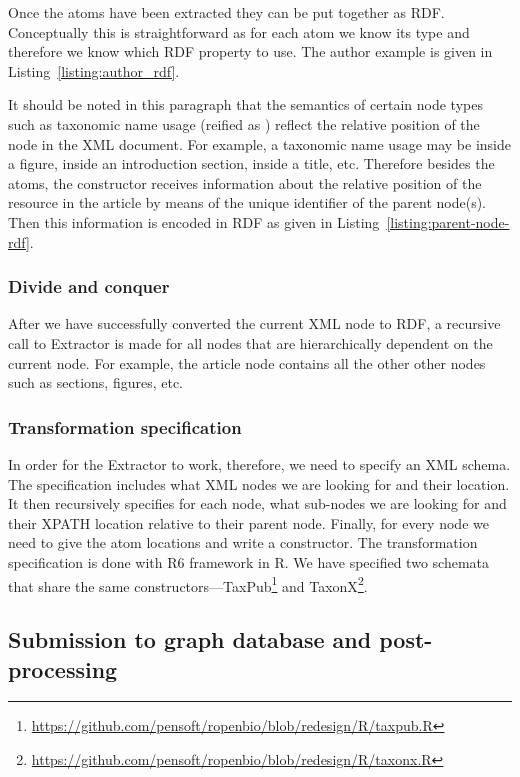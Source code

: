 Once the atoms have been extracted they can be put together as RDF. Conceptually this is straightforward as for each atom we know its type  and therefore we know which RDF property to use. The author example is given in Listing~\ref{listing:author_rdf}.

It should be noted in this paragraph that the semantics of certain node types such as taxonomic name usage (reified as ) reflect the relative position of the node in the XML document. For example, a taxonomic name usage may be inside a figure, inside an introduction section, inside a title, etc. Therefore besides the atoms, the constructor receives information about the relative position of the resource in the article by means of the unique identifier of the parent node(s). Then this information is encoded in RDF as given in Listing~\ref{listing:parent-node-rdf}. 



\subsubsection{Divide and conquer}

After we have successfully converted the current XML node to RDF, a recursive call to Extractor is made for all nodes that are hierarchically dependent on the current node. For example, the article node contains all the other other nodes such as sections, figures, etc.

\subsubsection{Transformation specification}

In order for the Extractor to work, therefore, we need to specify an XML schema. The specification includes what XML nodes we are looking for and their location. It then recursively specifies for each node, what sub-nodes we are looking for and their XPATH location relative to their parent node. Finally, for every node we need to give the atom locations and write a constructor. The transformation specification is done with R6 framework in R. We have specified two schemata that share the same constructors---TaxPub\footnote{\url{https://github.com/pensoft/ropenbio/blob/redesign/R/taxpub.R}} and TaxonX\footnote{\url{https://github.com/pensoft/ropenbio/blob/redesign/R/taxonx.R}}.

\subsection{Submission to graph database and post-processing}

